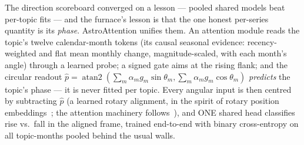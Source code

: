 \documentclass[11pt]{artaquest}
\begin{document}
The direction scoreboard converged on a lesson --- pooled shared models beat per-topic fits ---
and the furnace's lesson is that the one honest per-series quantity is its \emph{phase}. AstroAttention
unifies them. An attention module reads the topic's twelve calendar-month tokens (its causal
seasonal evidence: recency-weighted and flat mean monthly change, magnitude-scaled, with each
month's angle) through a learned probe; a signed gate aims at the rising flank; and the circular
readout $\hat{p} = \operatorname{atan2}(\sum_m \alpha_m g_m \sin\theta_m, \sum_m \alpha_m g_m
\cos\theta_m)$ \emph{predicts} the topic's phase --- it is never fitted per topic. Every angular
input is then centred by subtracting $\hat{p}$ (a learned rotary alignment, in the spirit of
rotary position embeddings~\citep{su2024roformer}; the attention machinery follows~\citealt{vaswani2017attention}), and ONE shared head classifies rise vs.\ fall in the aligned frame,
trained end-to-end with binary cross-entropy on all topic-months pooled behind the usual walls.
\end{document}
